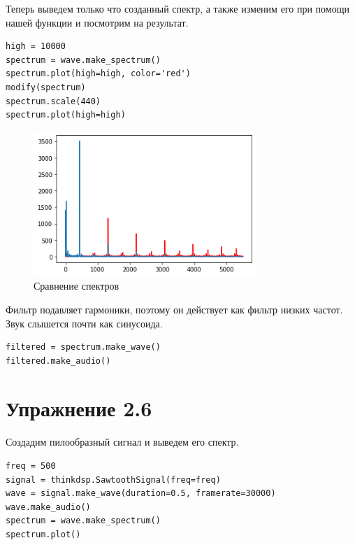 \documentclass[a4paper,12pt]{report}
\begin{document}
Теперь выведем только что созданный спектр, а также изменим его при помощи нашей функции и посмотрим на результат.

\begin{lstlisting}[caption=Сравнение спектров]
high = 10000
spectrum = wave.make_spectrum()
spectrum.plot(high=high, color='red')
modify(spectrum)
spectrum.scale(440)
spectrum.plot(high=high)
\end{lstlisting}

\begin{figure}[H]
        \centering
        \includegraphics[width=0.75\textwidth]{6.png}
        \caption{Сравнение спектров}
        \label{fig:fig5_1}
\end{figure}

Фильтр подавляет гармоники, поэтому он действует как фильтр низких частот. Звук слышется почти как синусоида.

\begin{lstlisting}[caption=Воспроизведение отфильтрованного звука]
filtered = spectrum.make_wave()
filtered.make_audio()
\end{lstlisting}

\chapter{Упражнение 2.6}

Создадим пилообразный сигнал и выведем его спектр.

\begin{lstlisting}[caption=Создание сигнала и визуализация его спектра]
freq = 500
signal = thinkdsp.SawtoothSignal(freq=freq)
wave = signal.make_wave(duration=0.5, framerate=30000)
wave.make_audio()
spectrum = wave.make_spectrum()
spectrum.plot()
\end{lstlisting}
\end{document}
